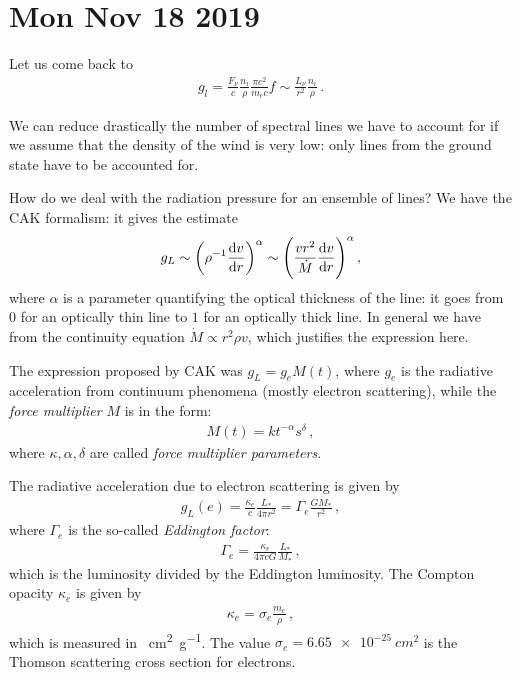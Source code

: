 \documentclass[main.tex]{subfiles}
\begin{document}
\section*{Mon Nov 18 2019}

Let us come back to 
%
\begin{align}
  g_l = \frac{F_\nu }{c} \frac{n_i}{\rho } \frac{\pi e^2}{m_e c} f \sim \frac{L_{\nu }}{r^2} \frac{n_i}{\rho }
\,.
\end{align}

We can reduce drastically the number of spectral lines we have to account for if we assume that the density of the wind is very low: only lines from the ground state have to be accounted for.

How do we deal with the radiation pressure for an ensemble of lines?
We have the CAK formalism: it gives the estimate 
%
\begin{align}
  g_{L} \sim \qty(\rho^{-1} \dv{v}{r})^{\alpha }
  \sim \qty(\frac{vr^2}{\dot{M}} \dv{v}{r})^{\alpha }
\,,
\end{align}
%
where \(\alpha \) is a parameter quantifying the optical thickness of the line: it goes from \(0\) for an optically thin line to \(1\) for an optically thick line. 
In general we have from the continuity equation \(\dot{M} \propto r^2 \rho v\), which justifies the expression here.

The expression proposed by CAK was \(g_L = g_e M(t)\), where \(g_e\) is the radiative acceleration from continuum phenomena (mostly electron scattering), while the \emph{force multiplier} \(M\) is in the form: 
%
\begin{align}
  M(t)  = k t^{-\alpha } s^{ \delta }
\,,
\end{align}
%
where \(\kappa , \alpha , \delta \) are called \emph{force multiplier parameters}.

The radiative acceleration due to electron scattering is given by 
%
\begin{align}
  g_L (e) = \frac{\kappa _e}{c} \frac{L_{*}}{4 \pi r^2} = \Gamma _e \frac{GM_{*}}{r^2}
\,,
\end{align}
%
where \(\Gamma _e \) is the so-called \emph{Eddington factor}: 
%
\begin{align}
  \Gamma _e = \frac{\kappa _e}{4 \pi c G} \frac{L_{*}}{M_{*}}
\,,
\end{align}
%
which is the luminosity divided by the Eddington luminosity.
The Compton opacity \(\kappa _e\) is given by 
%
\begin{align}
  \kappa _e = \sigma _e \frac{m_e}{\rho }
\,,
\end{align}
%
which is measured in \SI{}{cm^2g^{-1}}. The value \(\sigma _e = \SI{6.65e-25}{cm^2}\) is the Thomson scattering cross section for electrons.
\end{document}
